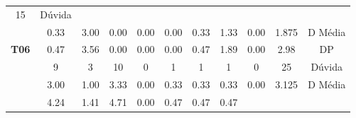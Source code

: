 \begin{table}[htbp]
\begin{tabular}{|ccccccccccc|}
		\multicolumn{1}{c|}{15} &
		Dúvida \\ \cline{2-11} 
		\rowcolor[HTML]{D9D9D9} 
		\multicolumn{1}{|c|}{\cellcolor[HTML]{F2F2F2}} &
		\multicolumn{1}{c|}{\cellcolor[HTML]{D9D9D9}0.33} &
		\multicolumn{1}{c|}{\cellcolor[HTML]{D9D9D9}3.00} &
		\multicolumn{1}{c|}{\cellcolor[HTML]{D9D9D9}0.00} &
		\multicolumn{1}{c|}{\cellcolor[HTML]{D9D9D9}0.00} &
		\multicolumn{1}{c|}{\cellcolor[HTML]{D9D9D9}0.00} &
		\multicolumn{1}{c|}{\cellcolor[HTML]{D9D9D9}0.33} &
		\multicolumn{1}{c|}{\cellcolor[HTML]{D9D9D9}1.33} &
		\multicolumn{1}{c|}{\cellcolor[HTML]{D9D9D9}0.00} &
		\multicolumn{1}{c|}{\cellcolor[HTML]{D9D9D9}1.875} &
		D Média \\ \cline{2-11} 
		\multicolumn{1}{|c|}{\multirow{-3}{*}{\cellcolor[HTML]{F2F2F2}\textbf{T06}}} &
		\multicolumn{1}{c|}{0.47} &
		\multicolumn{1}{c|}{3.56} &
		\multicolumn{1}{c|}{0.00} &
		\multicolumn{1}{c|}{0.00} &
		\multicolumn{1}{c|}{0.00} &
		\multicolumn{1}{c|}{0.47} &
		\multicolumn{1}{c|}{1.89} &
		\multicolumn{1}{c|}{0.00} &
		\multicolumn{1}{c|}{2.98} &
		DP \\ \hline
		\rowcolor[HTML]{D9D9D9} 
		\multicolumn{1}{|c|}{\cellcolor[HTML]{F2F2F2}} &
		\multicolumn{1}{c|}{\cellcolor[HTML]{D9D9D9}9} &
		\multicolumn{1}{c|}{\cellcolor[HTML]{D9D9D9}3} &
		\multicolumn{1}{c|}{\cellcolor[HTML]{D9D9D9}10} &
		\multicolumn{1}{c|}{\cellcolor[HTML]{D9D9D9}0} &
		\multicolumn{1}{c|}{\cellcolor[HTML]{D9D9D9}1} &
		\multicolumn{1}{c|}{\cellcolor[HTML]{D9D9D9}1} &
		\multicolumn{1}{c|}{\cellcolor[HTML]{D9D9D9}1} &
		\multicolumn{1}{c|}{\cellcolor[HTML]{D9D9D9}0} &
		\multicolumn{1}{c|}{\cellcolor[HTML]{D9D9D9}25} &
		Dúvida \\ \cline{2-11} 
		\multicolumn{1}{|c|}{\cellcolor[HTML]{F2F2F2}} &
		\multicolumn{1}{c|}{3.00} &
		\multicolumn{1}{c|}{1.00} &
		\multicolumn{1}{c|}{3.33} &
		\multicolumn{1}{c|}{0.00} &
		\multicolumn{1}{c|}{0.33} &
		\multicolumn{1}{c|}{0.33} &
		\multicolumn{1}{c|}{0.33} &
		\multicolumn{1}{c|}{0.00} &
		\multicolumn{1}{c|}{3.125} &
		D Média \\ \cline{2-11} 
		\rowcolor[HTML]{D9D9D9} 
		\multicolumn{1}{|c|}{\multirow{-3}{*}{\cellcolor[HTML]{F2F2F2}\textbf{T08}}} &
		\multicolumn{1}{c|}{\cellcolor[HTML]{D9D9D9}4.24} &
		\multicolumn{1}{c|}{\cellcolor[HTML]{D9D9D9}1.41} &
		\multicolumn{1}{c|}{\cellcolor[HTML]{D9D9D9}4.71} &
		\multicolumn{1}{c|}{\cellcolor[HTML]{D9D9D9}0.00} &
		\multicolumn{1}{c|}{\cellcolor[HTML]{D9D9D9}0.47} &
		\multicolumn{1}{c|}{\cellcolor[HTML]{D9D9D9}0.47} &
		\multicolumn{1}{c|}{\cellcolor[HTML]{D9D9D9}0.47} &

\end{tabular}
\end{table}
